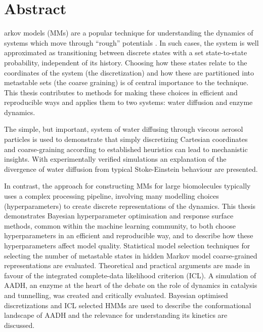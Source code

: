%
%
%

\chapter*{Abstract}
\begin{SingleSpace}
arkov models (MMs) are a popular technique for understanding the dynamics of systems which move through ``rough'' potentials \cite{zwanzigDiffusionRoughPotential1988}. In such cases, the system is well approximated as transitioning between discrete states with a set state-to-state probability, independent of its history. Choosing how these states relate to the coordinates of the system (the discretization) and how these are partitioned into metastable sets (the coarse graining) is of central importance to the technique. This thesis contributes to methods for making these choices in efficient and reproducible ways and applies them to two systems: water diffusion and enzyme dynamics.
 
The simple, but important, system of water diffusing through viscous aerosol particles is used to demonstrate that simply discretizing Cartesian coordinates and coarse-graining according to established heuristics can lead to mechanistic insights. With experimentally verified simulations an explanation of the divergence of water diffusion from typical Stoke-Einstein behaviour are presented.
 
In contrast, the approach for constructing MMs for large biomolecules typically uses a complex processing pipeline, involving many modelling choices (hyperparameters) to create discrete representations of the dynamics. This thesis demonstrates Bayesian hyperparameter optimisation and response surface methods, common within the machine learning community, to both choose hyperparameters in an efficient and reproducible way, and to describe how these hyperparameters affect model quality. Statistical model selection techniques for selecting the number of metastable states in hidden Markov model coarse-grained representations are evaluated. Theoretical and practical arguments are made in favour of the integrated complete-data likelihood criterion (ICL). A simulation of AADH, an enzyme at the heart of the debate on the role of dynamics in catalysis and tunnelling, was created and critically evaluated. Bayesian optimised discretizations and ICL selected HMMs are used to describe the conformational landscape of AADH and the relevance for understanding its kinetics are discussed.
 

\end{SingleSpace}
\clearpage